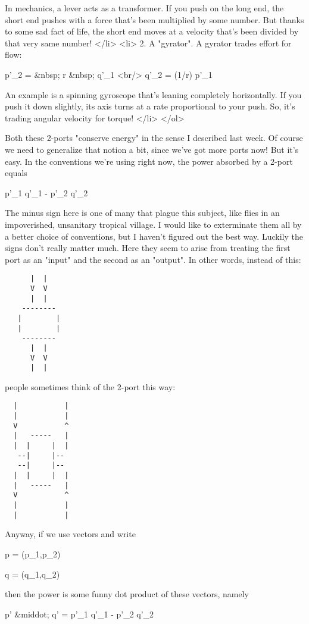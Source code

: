   In mechanics, a lever acts as a transformer.  If you push on the 
  long end, the short end pushes with a force that's been multiplied
  by some number.  But thanks to some sad fact of life, the short end
  moves at a velocity that's been divided by that very same number!
</li>
<li>
  2. A "gyrator".  A gyrator trades effort for flow:

  p'_{2} =  &nbsp; r &nbsp;  q'_{1} <br/>
  q'_{2} = (1/r) p'_{1}

  An example is a spinning gyroscope that's leaning completely 
  horizontally.  If you push it down slightly, its axis turns 
  at a rate proportional to your push.  So, it's trading angular
  velocity for torque!
</li>
</ol>

Both these 2-ports "conserve energy" in the sense I described last
week.  Of course we need to generalize that notion a bit, since we've 
got more ports now!  But it's easy.  In the conventions we're using
right now, the power absorbed by a 2-port equals

p'_{1} q'_{1} - p'_{2} q'_{2}

The minus sign here is one of many that plague this subject, like
flies in an impoverished, unsanitary tropical village.  I would like
to exterminate them all by a better choice of conventions, but I
haven't figured out the best way.  Luckily the signs don't really
matter much.  Here they seem to arise from treating the first port as
an "input" and the second as an "output".  
In other words, instead of this:

\begin{verbatim}
      |  |
      V  V
      |  |
    --------
   |        |
   |        |
    --------
      |  |
      V  V
      |  |
\end{verbatim}
    

people sometimes think of the 2-port this way:

\begin{verbatim}
  |           |
  |           |
  V           ^
  |   -----   |
  |  |     |  |
   --|     |--
   --|     |--
  |  |     |  |
  |   -----   |
  V           ^
  |           |
  |           |
\end{verbatim}
    

Anyway, if we use vectors and write 

p = (p_{1},p_{2})

q = (q_{1},q_{2})

then the power is some funny dot product of these vectors, namely

p' &middot; q' = p'_{1} q'_{1} - p'_{2} q'_{2}

